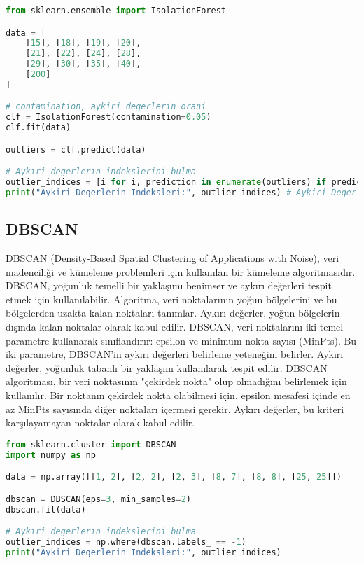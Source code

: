 \begin{lstlisting}[language=Python]
from sklearn.ensemble import IsolationForest

data = [
    [15], [18], [19], [20],
    [21], [22], [24], [28],
    [29], [30], [35], [40],
    [200]
]

# contamination, aykiri degerlerin orani
clf = IsolationForest(contamination=0.05)
clf.fit(data)

outliers = clf.predict(data)

# Aykiri degerlerin indekslerini bulma
outlier_indices = [i for i, prediction in enumerate(outliers) if prediction == -1]
print("Aykiri Degerlerin Indeksleri:", outlier_indices) # Aykiri Degerlerin Indeksleri: [12]
\end{lstlisting}

\subsection{DBSCAN}
DBSCAN (Density-Based Spatial Clustering of Applications with Noise), veri madenciliği ve kümeleme problemleri için kullanılan bir kümeleme algoritmasıdır. DBSCAN, yoğunluk temelli bir yaklaşımı benimser ve aykırı değerleri tespit etmek için kullanılabilir. Algoritma, veri noktalarının yoğun bölgelerini ve bu bölgelerden uzakta kalan noktaları tanımlar. Aykırı değerler, yoğun bölgelerin dışında kalan noktalar olarak kabul edilir. DBSCAN, veri noktalarını iki temel parametre kullanarak sınıflandırır: epsilon ve minimum nokta sayısı (MinPts). Bu iki parametre, DBSCAN'in aykırı değerleri belirleme yeteneğini belirler. Aykırı değerler, yoğunluk tabanlı bir yaklaşım kullanılarak tespit edilir. DBSCAN algoritması, bir veri noktasının "çekirdek nokta" olup olmadığını belirlemek için kullanılır. Bir noktanın çekirdek nokta olabilmesi için, epsilon mesafesi içinde en az MinPts sayısında diğer noktaları içermesi gerekir. Aykırı değerler, bu kriteri karşılayamayan noktalar olarak kabul edilir.

\begin{lstlisting}[language=Python]
from sklearn.cluster import DBSCAN
import numpy as np

data = np.array([[1, 2], [2, 2], [2, 3], [8, 7], [8, 8], [25, 25]])

dbscan = DBSCAN(eps=3, min_samples=2)
dbscan.fit(data)

# Aykiri degerlerin indekslerini bulma
outlier_indices = np.where(dbscan.labels_ == -1)
print("Aykiri Degerlerin Indeksleri:", outlier_indices)
\end{lstlisting}

